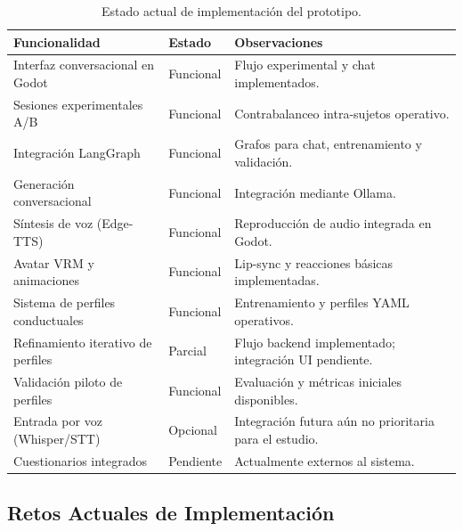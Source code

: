 \documentclass[12pt]{article}
\begin{document}
\begin{table}[H]
\centering
\small
\renewcommand{\arraystretch}{1.2}

\begin{tabular}{p{6cm} p{2.5cm} p{5cm}}
\toprule
\textbf{Funcionalidad} & \textbf{Estado} & \textbf{Observaciones} \\
\midrule

Interfaz conversacional en Godot
& Funcional
& Flujo experimental y chat implementados. \\

Sesiones experimentales A/B
& Funcional
& Contrabalanceo intra-sujetos operativo. \\

Integración LangGraph
& Funcional
& Grafos para chat, entrenamiento y validación. \\

Generación conversacional
& Funcional
& Integración mediante Ollama. \\

Síntesis de voz (Edge-TTS)
& Funcional
& Reproducción de audio integrada en Godot. \\

Avatar VRM y animaciones
& Funcional
& Lip-sync y reacciones básicas implementadas. \\

Sistema de perfiles conductuales
& Funcional
& Entrenamiento y perfiles YAML operativos. \\

Refinamiento iterativo de perfiles
& Parcial
& Flujo backend implementado; integración UI pendiente. \\

Validación piloto de perfiles
& Funcional
& Evaluación y métricas iniciales disponibles. \\

Entrada por voz (Whisper/STT)
& Opcional
& Integración futura aún no prioritaria para el estudio. \\

Cuestionarios integrados
& Pendiente
& Actualmente externos al sistema. \\

\bottomrule
\end{tabular}

\caption{Estado actual de implementación del prototipo.}

\end{table}

\subsection{Retos Actuales de Implementación}
\end{document}
